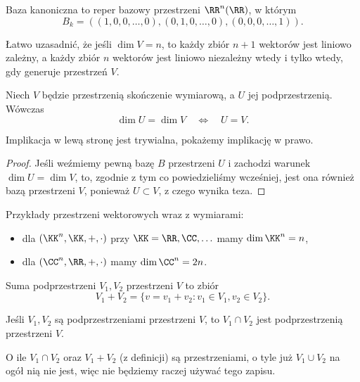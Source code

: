 \begin{definition}
    Baza kanoniczna to reper bazowy przestrzeni $\RR^n(\RR)$, w którym
    \[ B_k = \left((1,0,0,\ldots,0), (0,1,0,\ldots,0), (0,0,0,\ldots,1)\right). \]
\end{definition}

Łatwo uzasadnić, że jeśli $\dim V = n$, to każdy zbiór $n + 1$ wektorów jest liniowo zależny, a każdy zbiór $n$ wektorów jest liniowo niezależny wtedy i tylko wtedy, gdy generuje przestrzeń $V$.

\begin{theorem}
    Niech $V$ będzie przestrzenią skończenie wymiarową, a $U$ jej podprzestrzenią. Wówczas
    \[ \dim U = \dim V \quad\iff\quad U = V. \]
\end{theorem}
Implikacja w lewą stronę jest trywialna, pokażemy implikację w prawo.
\begin{proof}
    Jeśli weźmiemy pewną bazę $B$ przestrzeni $U$ i zachodzi warunek $\dim U = \dim V$, to, zgodnie z tym co powiedzieliśmy wcześniej, jest ona również bazą przestrzeni $V$, ponieważ $U \subset V$, z czego wynika teza.
\end{proof}

\begin{example}
    Przykłady przestrzeni wektorowych wraz z wymiarami:
    \begin{itemize}
        \item dla $(\KK^n, \KK, +, \cdot)$ przy $\KK = \RR, \CC, \ldots$ mamy $\dim \KK^n = n$,
        \item dla $(\CC^n, \RR, +, \cdot)$ mamy $\dim \CC^n = 2n$.
    \end{itemize}
\end{example}

\begin{definition}
    \label{d:sum of spaces}
    Suma podprzestrzeni $V_1, V_2$ przestrzeni $V$ to zbiór
    \[ V_1 + V_2 = \{v = v_1 + v_2 : v_1 \in V_1, v_2 \in V_2\}. \]
\end{definition}

\begin{fact}
    Jeśli $V_1, V_2$ są podprzestrzeniami przestrzeni $V$, to $V_1 \cap V_2$ jest podprzestrzenią przestrzeni $V$.
\end{fact}

\begin{remark}
    O ile $V_1 \cap V_2$ oraz $V_1 + V_2$ (z definicji) są przestrzeniami, o tyle już $V_1 \cup V_2$ na ogół nią nie jest, więc nie będziemy raczej używać tego zapisu.
\end{remark}

